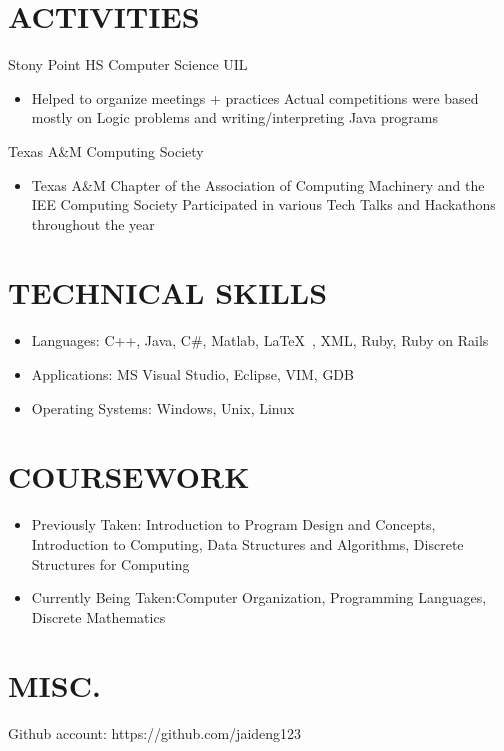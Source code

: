 \documentclass[margin,11pt]{res} %
\begin{document}
\begin{resume}
\section{ACTIVITIES}      Stony Point HS Computer Science UIL
					\begin{itemize} %
                    \item[] Helped to organize meetings + practices
						Actual competitions were based mostly on Logic problems and 							writing/interpreting Java programs
                    \end{itemize}   
                    Texas A\&M Computing Society	
					\begin{itemize} %
                    \item[] Texas A\&M Chapter of the Association of Computing 									Machinery and the IEE Computing Society
						Participated in various Tech Talks and Hackathons throughout 							the year
                    \end{itemize}     
 
 
\section{TECHNICAL SKILLS}	
							\begin{itemize}
                    		\item Languages: C++, Java, C\#, Matlab, \LaTeX\ , XML, 								Ruby, Ruby on Rails
                    		\item Applications: MS Visual Studio, Eclipse, VIM, GDB
                    		\item Operating Systems: Windows, Unix, Linux
                    		\end{itemize} 
\section{COURSEWORK}		\begin{itemize}
							\item Previously Taken: Introduction to Program Design 									and Concepts, Introduction to Computing, Data Structures and Algorithms, Discrete Structures for Computing
							\item Currently Being Taken:Computer Organization,
							Programming Languages, Discrete Mathematics
							\end{itemize}
							
\section{MISC.} Github account: https://github.com/jaideng123
\end{resume} 
\end{document}
